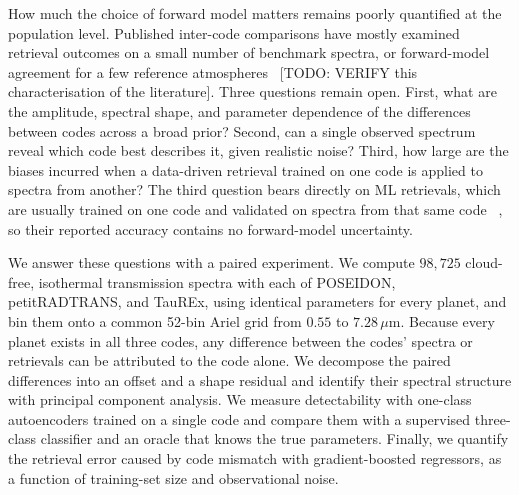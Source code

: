 How much the choice of forward model matters remains poorly quantified at the population level.
Published inter-code comparisons have mostly examined retrieval outcomes on a small number of benchmark spectra, or forward-model agreement for a few reference atmospheres~\cite{TODO_barstow_2020_retrieval_comparison,TODO_baudino_2017_model_comparison}%
[TODO: VERIFY this characterisation of the literature].
Three questions remain open.
First, what are the amplitude, spectral shape, and parameter dependence of the differences between codes across a broad prior?
Second, can a single observed spectrum reveal which code best describes it, given realistic noise?
Third, how large are the biases incurred when a data-driven retrieval trained on one code is applied to spectra from another?
The third question bears directly on ML retrievals, which are usually trained on one code and validated on spectra from that same code~\cite{TODO_ml_retrieval_single_code_validation}%
, so their reported accuracy contains no forward-model uncertainty.

We answer these questions with a paired experiment.
We compute $98{,}725$ cloud-free, isothermal transmission spectra with each of POSEIDON, petitRADTRANS, and TauREx, using identical parameters for every planet, and bin them onto a common 52-bin Ariel grid from $0.55$ to $7.28\,\mu$m.
Because every planet exists in all three codes, any difference between the codes' spectra or retrievals can be attributed to the code alone.
We decompose the paired differences into an offset and a shape residual and identify their spectral structure with principal component analysis.
We measure detectability with one-class autoencoders trained on a single code and compare them with a supervised three-class classifier and an oracle that knows the true parameters.
Finally, we quantify the retrieval error caused by code mismatch with gradient-boosted regressors, as a function of training-set size and observational noise.

